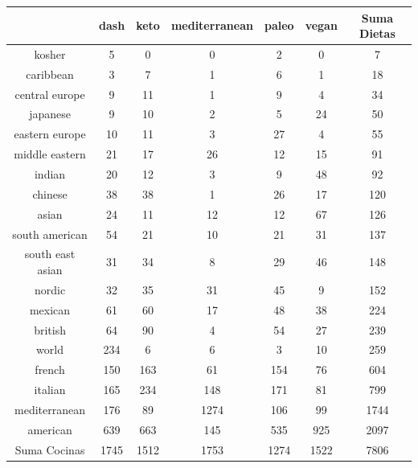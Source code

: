 \documentclass[12pt,a4paper]{article}
\begin{document}
        \begin{center}
            \begin{tabular}{| c | c c c c c | c |}
                \toprule
                & dash & keto & mediterranean & paleo & vegan & Suma Dietas \\
                \midrule
                kosher           & 5    & 0    & 0    & 2    & 0    & 7    \\
                caribbean        & 3    & 7    & 1    & 6    & 1    & 18   \\
                central europe   & 9    & 11   & 1    & 9    & 4    & 34   \\
                japanese         & 9    & 10   & 2    & 5    & 24   & 50   \\
                eastern europe   & 10   & 11   & 3    & 27   & 4    & 55   \\
                middle eastern   & 21   & 17   & 26   & 12   & 15   & 91   \\
                indian           & 20   & 12   & 3    & 9    & 48   & 92   \\
                chinese          & 38   & 38   & 1    & 26   & 17   & 120  \\
                asian            & 24   & 11   & 12   & 12   & 67   & 126  \\
                south american   & 54   & 21   & 10   & 21   & 31   & 137  \\
                south east asian & 31   & 34   & 8    & 29   & 46   & 148  \\
                nordic           & 32   & 35   & 31   & 45   & 9    & 152  \\
                mexican          & 61   & 60   & 17   & 48   & 38   & 224  \\
                british          & 64   & 90   & 4    & 54   & 27   & 239  \\
                world            & 234  & 6    & 6    & 3    & 10   & 259  \\
                french           & 150  & 163  & 61   & 154  & 76   & 604  \\
                italian          & 165  & 234  & 148  & 171  & 81   & 799  \\
                mediterranean    & 176  & 89   & 1274 & 106  & 99   & 1744 \\
                american         & 639  & 663  & 145  & 535  & 925  & 2097 \\
                \midrule
                Suma Cocinas     & 1745 & 1512 & 1753 & 1274 & 1522 & 7806 \\
                \bottomrule
            \end{tabular}
        \end{center}
\end{document}
